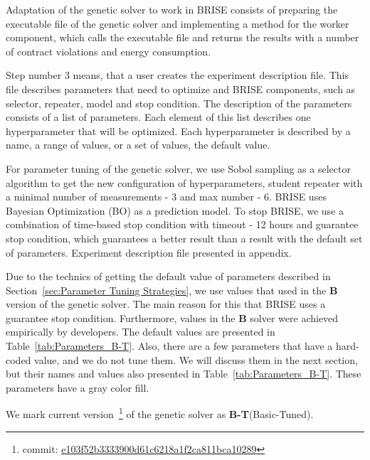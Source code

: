Adaptation of the genetic solver to work in BRISE consists of preparing the executable file of the genetic solver and implementing a method for the worker component, which calls the executable file and returns the results with a number of contract violations and energy consumption.

Step number 3 means, that a user creates the experiment description file. This file describes parameters that need to optimize and BRISE components, such as selector, repeater, model and stop condition. The description of the parameters consists of a list of parameters. Each element of this list describes one hyperparameter that will be optimized. Each hyperparameter is described by a name, a range of values, or a set of values, the default value.

For parameter tuning of the genetic solver, we use Sobol sampling as a selector algorithm to get the new configuration of hyperparameters, student repeater with a minimal number of measurements - 3 and max number - 6. BRISE uses Bayesian Optimization (BO) as a prediction model.
To stop BRISE, we use a combination of time-based stop condition with timeout - 12 hours and guarantee stop condition, which guarantees a better result than a result with the default set of parameters. Experiment description file presented in appendix.

Due to the technics of getting the default value of parameters described in Section~\ref{sec:Parameter Tuning Strategies}, we use values that used in the \textbf{B} version of the genetic solver. The main reason for this that BRISE uses a guarantee stop condition. Furthermore, values in the \textbf{B} solver were achieved empirically by developers. The default values are presented in Table~\ref{tab:Parameters_B-T}. Also, there are a few parameters that have a hard-coded value, and we do not tune them. We will discuss them in the next section, but their names and values also presented in Table~\ref{tab:Parameters_B-T}. These parameters have a gray color fill. 

We mark current version~\footnote{commit: \href{https://git-st.inf.tu-dresden.de/mquat/mquat2/commit/e103f52b3333900d61c6218a1f2ca811bca10289}{e103f52b3333900d61c6218a1f2ca811bca10289}} of the genetic solver as \textbf{B-T}(Basic-Tuned).


